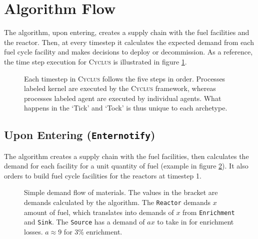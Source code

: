 \documentclass[12pt,letterpaper]{article}
\newcommand{\Cyclus}{\textsc{Cyclus}\xspace}%
\begin{document}
\section{Algorithm Flow}

The algorithm, upon entering, creates a supply chain with the fuel facilities and
the reactor. Then, at every timestep it calculates the expected demand from each fuel cycle
facility and makes decisions to deploy or decommission. As a reference, the time step
execution for \Cyclus is illustrated in figure \ref{diag:time}.

\begin{figure}[H]
\centering
{}
\caption{Each timestep in \Cyclus follows the five steps in order. Processes labeled
         kernel are executed by the \Cyclus framework, whereas processes labeled agent
         are executed by individual agents. What happens in the `Tick' and `Tock' is
         thus unique to each archetype.}
\label{diag:time}
\end{figure}


\subsection{Upon Entering (\texttt{Enternotify})}

The algorithm creates a supply chain with the fuel facilities,
then calculates the demand for each facility for a unit quantity of fuel
(example in figure \ref{diag:dem}). It also orders to build fuel cycle
facilities for the reactors at timestep 1.

\begin{figure}[H]
\caption{Simple demand flow of materials. The values in the bracket are demands calculated
         by the algorithm. The \texttt{Reactor} demands $x$ amount of fuel,
         which translates into demands of $x$ from \texttt{Enrichment} and \texttt{Sink}.
         The \texttt{Source} has a demand of $a x$ to take in for enrichment losses.
         $a \approx 9 $ for 3\% enrichment.}
\label{diag:dem}
\end{figure}
\end{document}
